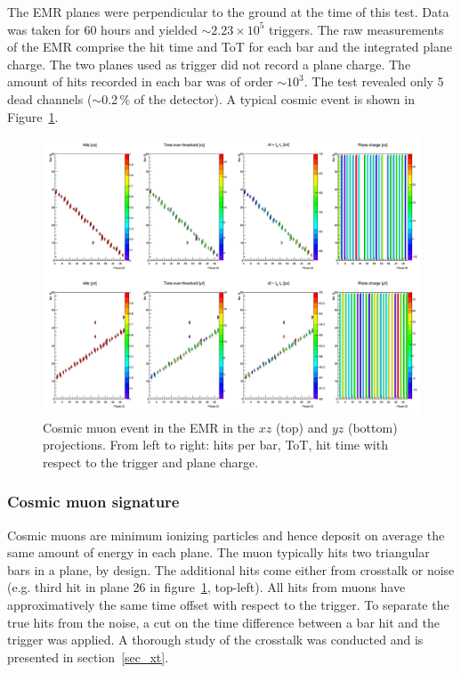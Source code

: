 \documentclass[a4paper,11pt]{article}
\begin{document}
The EMR planes were perpendicular to the ground at the time of this test. Data was taken for 60 hours and yielded $\sim2.23\times10^5$ triggers. The raw
measurements of the EMR comprise the hit time and ToT for each bar and the integrated plane charge. The two planes used as trigger did not record a plane
charge. The amount of hits recorded in each bar was of order $\sim10^3$.  The test revealed only 5 dead channels ($\sim$0.2\,\% of the detector). A typical
cosmic event is shown in Figure~\ref{fig:cosmic_muon}. 

\begin{figure}[!htr]
\centering
\includegraphics[width=\textwidth]{cosmic_event.png}
\caption{Cosmic muon event in the EMR in the $xz$ (top) and $yz$ (bottom) projections. From left to right: hits per bar, ToT, hit time
with respect to the trigger and plane charge.}
\label{fig:cosmic_muon}
\end{figure}

\subsubsection{Cosmic muon signature}\label{sec:cosmic_sig}
Cosmic muons are minimum ionizing particles and hence deposit on average the same amount of energy in each plane. The muon typically hits two triangular
bars in a plane, by design. The additional hits come either from crosstalk or noise (e.g. third hit in plane 26 in figure~\ref{fig:cosmic_muon},
top-left). All hits from muons have approximatively the same time offset with respect to the trigger. To separate the true hits from the noise, a cut on
the time difference between a bar hit and the trigger was applied. A thorough study of the crosstalk was conducted and is presented in section~\ref{sec_xt}.
 
\end{document}
